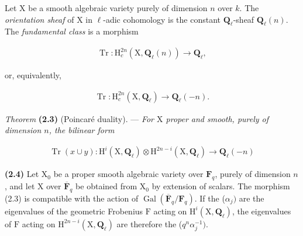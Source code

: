 \documentclass[10pt,leqno]{article}
\begin{document}
\noindent Let \(\mathrm{X}\) be a smooth algebraic variety purely of dimension \(n\) over \(k\). The \emph{orientation sheaf} of \(\mathrm{X}\) in \(\ell \)-adic cohomology is the constant \(\mathbf{Q}_{\ell }\)-sheaf \(\mathbf{Q}_{\ell }(n)\). The \emph{fundamental class} is a morphism\par

\begin{equation*}\begin{gathered}\operatorname{Tr} : \mathrm{H}_{c}^{2n}(\mathrm{X},\mathbf{Q}_{\ell }(n)) \longrightarrow  \mathbf{Q}_{\ell },\end{gathered}\end{equation*}

\noindent or, equivalently,\par

\begin{equation*}\begin{gathered}\operatorname{Tr} : \mathrm{H}_{c}^{2n}(\mathrm{X},\mathbf{Q}_{\ell }) \longrightarrow  \mathbf{Q}_{\ell }(- n).\end{gathered}\end{equation*}

\noindent \emph{Theorem} \textbf{(2.3)} (Poincaré duality). — {\itshape For \(\mathrm{X}\) proper and smooth, purely of dimension \(n\), the bilinear form}\par

\begin{equation*}\begin{gathered}\operatorname{Tr}(x\cup y) : \mathrm{H}^{i}(\mathrm{X},\mathbf{Q}_{\ell })\otimes \mathrm{H}^{2n- i}(\mathrm{X},\mathbf{Q}_{\ell }) \longrightarrow  \mathbf{Q}_{\ell }(- n)\end{gathered}\end{equation*}

\par

\noindent \textbf{(2.4)} Let \(\mathrm{X}_{0}\) be a proper smooth algebraic variety over \(\mathbf{F}_{q}\), purely of dimension \(n\), and let \(\mathrm{X}\) over \(\overline{\mathbf{F}}_{q}\) be obtained from \(\mathrm{X}_{0}\) by extension of scalars. The morphism (2.3) is compatible with the action of \(\operatorname{Gal}(\overline{\mathbf{F}}_{q}/\mathbf{F}_{q})\). If the (\(\alpha _{j})\) are the eigenvalues of the geometric Frobenius \(\mathrm{F}\) acting on \(\mathrm{H}^{i}(\mathrm{X},\mathbf{Q}_{\ell })\), the eigenvalues of \(\mathrm{F}\) acting on \(\mathrm{H}^{2n- i}(\mathrm{X},\mathbf{Q}_{\ell })\) are therefore the (\(q^{n}\alpha _{j}^{- 1})\).\par
\end{document}
